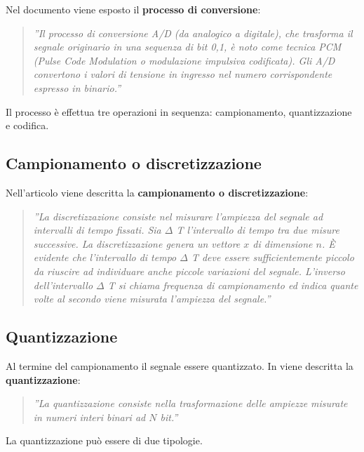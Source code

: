 \documentclass[a4paper]{report} %
\begin{document}
Nel documento \cite{art:rif.7} viene esposto il \textbf{processo di conversione}: 
\begin{quote}
	\textit{''Il processo di conversione A/D (da analogico a digitale), che trasforma il segnale originario in una sequenza di bit {0,1}, è noto come tecnica PCM (Pulse Code Modulation o modulazione impulsiva codificata). Gli A/D convertono i valori di tensione in ingresso nel numero corrispondente espresso in binario.''}
\end{quote}
Il processo è effettua tre operazioni in sequenza: campionamento, quantizzazione e codifica. 
 
\subsection{Campionamento o discretizzazione}
Nell'articolo \cite{art:rif.2} viene descritta la \textbf{campionamento o discretizzazione}:
\begin{quote}
	\textit{''La discretizzazione consiste nel misurare l'ampiezza del segnale ad intervalli di tempo fissati. Sia $\Delta$ T l'intervallo di tempo tra due misure successive. La discretizzazione genera un vettore $x$ di dimensione $n$. È evidente che l'intervallo di tempo $\Delta$ T deve essere sufficientemente piccolo da riuscire ad individuare anche piccole variazioni del segnale. L'inverso dell'intervallo $\Delta$ T si chiama frequenza di campionamento ed indica quante volte al secondo viene misurata l'ampiezza del segnale.''} 
\end{quote}
  
\subsection{Quantizzazione}
Al termine del campionamento il segnale essere quantizzato. In \cite{art:rif.2} viene descritta la \textbf{quantizzazione}:
\begin{quote}
	\textit{''La quantizzazione consiste nella trasformazione delle ampiezze misurate in numeri interi binari ad $N$ bit.''} 
\end{quote}
La quantizzazione può essere di due tipologie.
\end{document}

